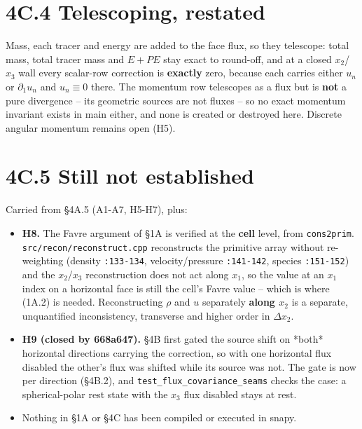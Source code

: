 \documentclass[11pt,a4paper]{article}
\begin{document}
\section*{4C.4 Telescoping, restated}

Mass, each tracer and energy are added to the face flux, so they telescope:
total mass, total tracer mass and $E+PE$ stay exact to round-off, and at a
closed $x_2$/$x_3$ wall every scalar-row correction is \textbf{exactly} zero, because
each carries either $u_n$ or $\partial_1u_n$ and $u_n\equiv0$ there. The
momentum row telescopes as a flux but is \textbf{not} a pure divergence -- its
geometric sources are not fluxes -- so no exact momentum invariant exists in
main either, and none is created or destroyed here. Discrete angular momentum
remains open (H5).

\section*{4C.5 Still not established}

Carried from §4A.5 (A1-A7, H5-H7), plus:

\begin{itemize}
\item \textbf{H8.} The Favre argument of §1A is verified at the \textbf{cell} level, from
  \texttt{cons2prim}. \texttt{src/recon/reconstruct.cpp} reconstructs the primitive array
  without re-weighting (density \texttt{:133-134}, velocity/pressure \texttt{:141-142},
  species \texttt{:151-152}) and the $x_2$/$x_3$ reconstruction does not act along
  $x_1$, so the value at an $x_1$ index on a horizontal face is still the
  cell's Favre value -- which is where (1A.2) is needed. Reconstructing $\rho$
  and $u$ separately \textbf{along $x_2$} is a separate, unquantified inconsistency,
  transverse and higher order in $\Delta x_2$.
\item \textbf{H9 (closed by 668a647).} §4B first gated the source shift on *both*
  horizontal directions carrying the correction, so with one horizontal flux
  disabled the other's flux was shifted while its source was not. The gate is
  now per direction (§4B.2), and \texttt{test\_flux\_covariance\_seams} checks the case:
  a spherical-polar rest state with the $x_3$ flux disabled stays at rest.
\item Nothing in §1A or §4C has been compiled or executed in snapy.
\end{itemize}
\end{document}
